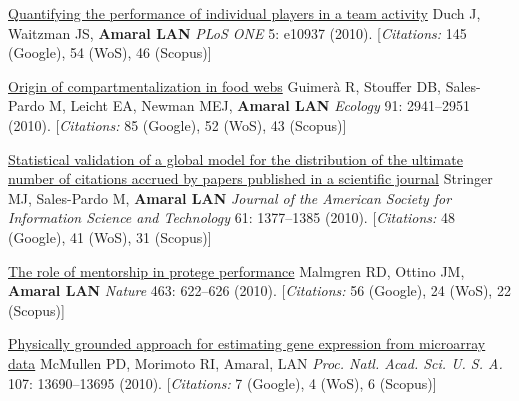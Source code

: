 \NumberedItem{\makebox[0.8cm][r]{[90]}}
\href{/people/amaral/quantifying-performance-individual-players-team-activity}
{Quantifying the performance of individual players in a team activity}
\newline
Duch J, Waitzman JS, {\textbf{Amaral LAN}}
\newline
\textit{PLoS ONE}
    5:
e10937 (2010).
    [{\em{Citations:}} 145 (Google), 54 (WoS), 46 (Scopus)]
\newline
\Gap
~
\Gap

\NumberedItem{\makebox[0.8cm][r]{[89]}}
\href{/people/amaral/origin-compartmentalization-food-webs}
{Origin of compartmentalization in food webs}
\newline
Guimer\`a R, Stouffer DB, Sales-Pardo M, Leicht EA, Newman MEJ, {\textbf{Amaral LAN}}
\newline
\textit{Ecology}
    91:
2941--2951 (2010).
    [{\em{Citations:}} 85 (Google), 52 (WoS), 43 (Scopus)]
\newline
\Gap
~
\Gap

\NumberedItem{\makebox[0.8cm][r]{[88]}}
\href{/people/amaral/statistical-validation-global-model-distribution-ultimate-number-citations-accrued-papers-published-scientific-journal}
{Statistical validation of a global model for the distribution of the ultimate number of citations accrued by papers published in a scientific journal}
\newline
Stringer MJ, Sales-Pardo M, {\textbf{Amaral LAN}}
\newline
\textit{Journal of the American Society for Information Science and Technology}
    61:
1377--1385 (2010).
    [{\em{Citations:}} 48 (Google), 41 (WoS), 31 (Scopus)]
\newline
\Gap
~
\Gap

\NumberedItem{\makebox[0.8cm][r]{[87]}}
\href{/people/amaral/role-mentorship-protege-performance}
{The role of mentorship in protege performance}
\newline
Malmgren RD, Ottino JM, {\textbf{Amaral LAN}}
\newline
\textit{Nature}
    463:
622--626 (2010).
    [{\em{Citations:}} 56 (Google), 24 (WoS), 22 (Scopus)]
\newline
\Gap
~
\Gap

\NumberedItem{\makebox[0.8cm][r]{[86]}}
\href{/people/amaral/physically-grounded-approach-estimating-gene-expression-microarray-data}
{Physically grounded approach for estimating gene expression from microarray data}
\newline
McMullen PD, Morimoto RI, Amaral, LAN
\newline
\textit{Proc. Natl. Acad. Sci. U. S. A.}
    107:
13690--13695 (2010).
    [{\em{Citations:}} 7 (Google), 4 (WoS), 6 (Scopus)]
\newline
\Gap
~
\Gap


